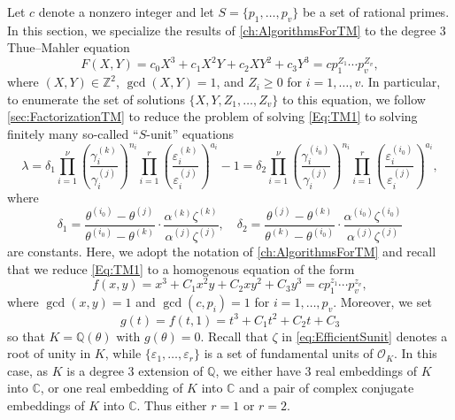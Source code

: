 \documentclass[11pt]{report}
\theoremstyle{definition}
\newcommand{\eps}{\varepsilon}
\begin{document}
Let $c$ denote a nonzero integer and let $S=\{p_1,\dotsc,p_v\}$ be a set of rational primes. In this section, we specialize the results of \autoref{ch:AlgorithmsForTM} to the degree $3$ Thue--Mahler equation
\begin{equation} \label{Eq:TM1}
F(X,Y) = c_0 X^3 + c_1 X^{2}Y + c_2XY^2 + c_3Y^3 = c p_1^{Z_1}\cdots p_v^{Z_v},
\end{equation}
where $(X,Y) \in \mathbb{Z}^2$, $\gcd(X,Y)=1$, and $Z_i \geq 0$ for $i = 1, \dots, v$. In particular, to enumerate the set of solutions $\{X,Y, Z_1, \dots, Z_v\}$ to this equation, we follow \autoref{sec:FactorizationTM} to reduce the problem of solving \eqref{Eq:TM1} to solving finitely many so-called ``$S$-unit'' equations
\begin{equation} \label{eq:EfficientSunit}
\lambda = \delta_1 \prod_{i = 1}^{\nu} \left( \frac{\gamma_i^{(k)}}{\gamma_i^{(j)}}\right)^{n_i} \prod_{i = 1}^r\left( \frac{\varepsilon_i^{(k)}}{\varepsilon_i^{(j)}}\right)^{a_i} - 1 = \delta_2 \prod_{i = 1}^{\nu} \left( \frac{\gamma_i^{(i_0)}}{\gamma_i^{(j)}}\right)^{n_i}\prod_{i = 1}^{r}\left( \frac{\varepsilon_i^{(i_0)}}{\varepsilon_i^{(j)}}\right)^{a_i},
\end{equation}
where
\[\delta_1 = \frac{\theta^{(i_0)} - \theta^{(j)}}{\theta^{(i_0)} - \theta^{(k)}}\cdot\frac{\alpha^{(k)}\zeta^{(k)}}{\alpha^{(j)}\zeta^{(j)}}, \quad \delta_2 = \frac{\theta^{(j)} - \theta^{(k)}}{\theta^{(k)} - \theta^{(i_0)}}\cdot \frac{\alpha^{(i_0)}\zeta^{(i_0)}}{\alpha^{(j)}\zeta^{(j)}}\]
are constants. Here, we adopt the notation of \autoref{ch:AlgorithmsForTM} and recall that we reduce \eqref{Eq:TM1} to a homogenous equation of the form
\begin{equation} \label{eq:Efficientpoly}
f(x,y) = x^3 + C_1x^2y + C_2xy^2 + C_3y^3 = cp_1^{z_1}\cdots p_v^{z_v},
\end{equation}
where $\gcd(x,y) = 1$ and $\gcd(c,p_i) = 1$ for $i = 1, \dots, p_v$. Moreover, we set
\begin{equation} \label{eq:Efficientg}
g(t) = f(t,1) = t^3 + C_1t^2 + C_2t + C_3
\end{equation}
so that $K = \mathbb{Q}(\theta)$ with $g(\theta) = 0$. Recall that $\zeta$ in \eqref{eq:EfficientSunit} denotes a root of unity in $K$, while $\{\eps_1, \dots, \eps_r\}$ is a set of fundamental units of $\mathcal{O}_K$. In this case, as $K$ is a degree $3$ extension of $\mathbb{Q}$, we either have $3$ real embeddings of $K$ into $\mathbb{C}$, or one real embedding of $K$ into $\mathbb{C}$ and a pair of complex conjugate embeddings of $K$ into $\mathbb{C}$. Thus either $r = 1$ or $r = 2$.
\end{document}
